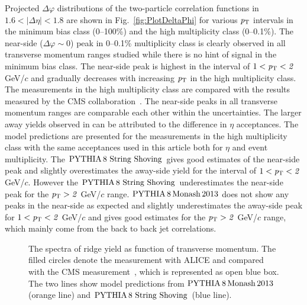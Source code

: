 Projected $\Delta\varphi$ distributions of the two-particle correlation functions in $1.6<|\Delta\eta|<1.8$ are shown in Fig.~\ref{fig:PlotDeltaPhi} for various $\it{p}_{\rm{T}}$ intervals in the minimum bias class (0--100\%) and the high multiplicity class (0--0.1\%). The near-side ($\Delta\varphi\sim 0$) peak in 0--0.1\% multiplicity class is clearly observed in all transverse momentum ranges studied while there is no hint of signal in the minimum bias class. The near-side peak is highest in the interval of $1<\it{p}_{\rm{T}}<2$ GeV/$c$ and gradually decreases with increasing $\it{p}_{\rm{T}}$ in the high multiplicity class. The measurements in the high multiplicity class are compared with the results measured by the CMS collaboration~\cite{Khachatryan:2015lva}. The near-side peaks in all transverse momentum ranges are comparable each other within the uncertainties. The larger away yields observed in \cite{Khachatryan:2015lva} can be attributed to the difference in $\eta$ acceptances. The model predictions are presented for the measurements in the high multiplicity class with the same acceptances used in this article both for $\eta$ and event multiplicity. The $\mathrm{PYTHIA}\,8~\mathrm{String}~\mathrm{Shoving}$ gives good estimates of the near-side peak and slightly overestimates the away-side yield for the interval of $1<\it{p}_{\rm{T}}<2$ GeV/$c$. However the $\mathrm{PYTHIA}\,8~\mathrm{String}~\mathrm{Shoving}$ underestimates the near-side peak for the $\it{p}_{\rm{T}}>2$ GeV/$c$ range. $\mathrm{PYTHIA}\,8\,\mathrm{Monash}\,2013$ does not show any peaks in the near-side as expected and slightly underestimates the away-side peak for $1<\it{p}_{\rm{T}}<2$ GeV/$c$ and gives good estimates for the $\it{p}_{\rm{T}}>2$ GeV/$c$ range, which mainly come from the back to back jet correlations.

\begin{figure}[h!]
	\centering
	\caption{ The spectra of ridge yield as function of transverse momentum. The filled circles denote the measurement with ALICE and compared with the CMS measurement~\cite{Khachatryan:2015lva}, which is represented as open blue box. The two lines show model predictions from $\mathrm{PYTHIA}\,8\,\mathrm{Monash}\,2013$ (orange line) and $\mathrm{PYTHIA}\,8~\mathrm{String}~\mathrm{Shoving}$ (blue line). }
	\label{fig:PlotYSpect}
\end{figure}

